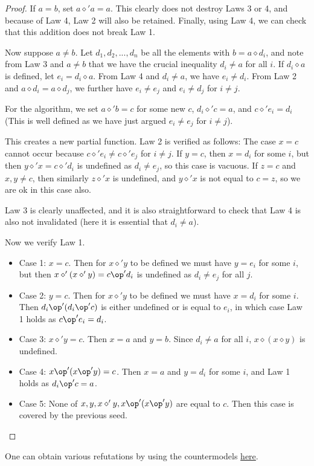 \begin{proof}


If $a = b$, set $a \diamond' a = a$.  This clearly does not destroy Laws 3 or 4, and because of Law 4, Law 2 will also be retained.
Finally, using Law 4, we can check that this addition does not break Law 1.

Now suppose $a \neq b$.
Let $d_1,d_2,..., d_n$ be all the elements with $b = a \diamond d_i$, and note from Law 3 and $a \neq b $ that we have the crucial inequality $d_i \neq a$ for all $i$.  If $d_i \diamond a$ is defined, let $e_i = d_i \diamond a.$ From Law 4 and $d_i \neq a$, we have $e_i \neq d_i$. From Law 2 and $a \diamond d_i = a \diamond d_j$, we further have $e_i \neq e_j$ and $e_i \neq d_j$ for $i \neq j$.

 For the algorithm, we set $a \diamond' b = c$ for some new $c$, $d_i \diamond' c = a$, and $c \diamond' e_i = d_i$ (This is well defined as we have just argued $e_i \neq e_j$ for $i \neq j$).

This creates a new partial function.  Law 2 is verified as follows:
The case $x=c$ cannot occur because $c \diamond' e_i \neq c \diamond' e_j$ for $i \neq j$.
If $y=c$, then $x = d_i$ for some $i$, but then $y \diamond' x = c \diamond' d_i$ is undefined as $d_i \neq e_j$, so this case is vacuous.
If $z=c$ and $x,y \neq c$, then similarly $z \diamond' x$ is undefined, and $y \diamond' x$ is not equal to
$c = z$, so we are ok in this case also.

Law 3 is clearly unaffected, and it is also straightforward to check that Law 4 is also not invalidated
(here it is essential that $d_i \neq a$).

Now we verify Law 1.
\begin{itemize}
  \item Case 1: $x=c$.  Then for $x \diamond' y$ to be defined we must have $y=e_i$ for some $i$, but then
$x \diamond' (x \diamond' y) = c \op' d_i$ is undefined as $d_i \neq e_j$ for all $j$.
\item Case 2: $y=c$. Then for $x \diamond' y$ to be defined we must have $x = d_i$ for some $i$. Then $d_i \op' (d_i \op' c)$ is either undefined or is equal to $e_i$, in which case Law 1 holds as $c \op' e_i = d_i$.
\item Case 3: $x \diamond' y = c$.  Then $x=a$ and $y=b$.  Since $d_i \neq a$ for all $i$, $x \diamond (x \diamond y)$ is undefined.
\item Case 4: $x \op' (x \op' y) = c$. Then $x = a$ and $y = d_i$ for some $i$, and Law 1 holds as $d_i \op' c = a$.
\item Case 5: None of $x, y, x \diamond' y, x \op' (x \op' y)$ are equal to $c$.  Then this case is covered by the previous seed.
\end{itemize}
\end{proof}
One can obtain various refutations by using the countermodels \href{https://leanprover.zulipchat.com/#narrow/channel/458659-Equational/topic/713.2C.201289.2C.201447/near/483735768}{here}.

